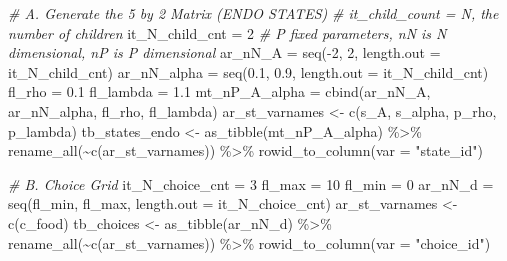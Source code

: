 \documentclass[
]{book}
\newenvironment{Shaded}{\begin{snugshade}}{\end{snugshade}}
\newcommand{\AttributeTok}[1]{\textcolor[rgb]{0.77,0.63,0.00}{#1}}
\newcommand{\CommentTok}[1]{\textcolor[rgb]{0.56,0.35,0.01}{\textit{#1}}}
\newcommand{\DecValTok}[1]{\textcolor[rgb]{0.00,0.00,0.81}{#1}}
\newcommand{\FloatTok}[1]{\textcolor[rgb]{0.00,0.00,0.81}{#1}}
\newcommand{\FunctionTok}[1]{\textcolor[rgb]{0.00,0.00,0.00}{#1}}
\newcommand{\NormalTok}[1]{#1}
\newcommand{\OtherTok}[1]{\textcolor[rgb]{0.56,0.35,0.01}{#1}}
\newcommand{\SpecialCharTok}[1]{\textcolor[rgb]{0.00,0.00,0.00}{#1}}
\newcommand{\StringTok}[1]{\textcolor[rgb]{0.31,0.60,0.02}{#1}}
\begin{document}
\begin{Shaded}
\begin{Highlighting}[]
\CommentTok{\# A. Generate the 5 by 2 Matrix (ENDO STATES)}
\CommentTok{\# it\_child\_count = N, the number of children}
\NormalTok{it\_N\_child\_cnt }\OtherTok{=} \DecValTok{2}
\CommentTok{\# P fixed parameters, nN is N dimensional, nP is P dimensional}
\NormalTok{ar\_nN\_A }\OtherTok{=} \FunctionTok{seq}\NormalTok{(}\SpecialCharTok{{-}}\DecValTok{2}\NormalTok{, }\DecValTok{2}\NormalTok{, }\AttributeTok{length.out =}\NormalTok{ it\_N\_child\_cnt)}
\NormalTok{ar\_nN\_alpha }\OtherTok{=} \FunctionTok{seq}\NormalTok{(}\FloatTok{0.1}\NormalTok{, }\FloatTok{0.9}\NormalTok{, }\AttributeTok{length.out =}\NormalTok{ it\_N\_child\_cnt)}
\NormalTok{fl\_rho }\OtherTok{=} \FloatTok{0.1}
\NormalTok{fl\_lambda }\OtherTok{=} \FloatTok{1.1}
\NormalTok{mt\_nP\_A\_alpha }\OtherTok{=} \FunctionTok{cbind}\NormalTok{(ar\_nN\_A, ar\_nN\_alpha, fl\_rho, fl\_lambda)}
\NormalTok{ar\_st\_varnames }\OtherTok{\textless{}{-}} \FunctionTok{c}\NormalTok{(}\StringTok{\textquotesingle{}s\_A\textquotesingle{}}\NormalTok{, }\StringTok{\textquotesingle{}s\_alpha\textquotesingle{}}\NormalTok{, }\StringTok{\textquotesingle{}p\_rho\textquotesingle{}}\NormalTok{, }\StringTok{\textquotesingle{}p\_lambda\textquotesingle{}}\NormalTok{)}
\NormalTok{tb\_states\_endo }\OtherTok{\textless{}{-}} \FunctionTok{as\_tibble}\NormalTok{(mt\_nP\_A\_alpha) }\SpecialCharTok{\%\textgreater{}\%}
  \FunctionTok{rename\_all}\NormalTok{(}\SpecialCharTok{\textasciitilde{}}\FunctionTok{c}\NormalTok{(ar\_st\_varnames)) }\SpecialCharTok{\%\textgreater{}\%}
  \FunctionTok{rowid\_to\_column}\NormalTok{(}\AttributeTok{var =} \StringTok{"state\_id"}\NormalTok{)}

\CommentTok{\# B. Choice Grid}
\NormalTok{it\_N\_choice\_cnt }\OtherTok{=} \DecValTok{3}
\NormalTok{fl\_max }\OtherTok{=} \DecValTok{10}
\NormalTok{fl\_min }\OtherTok{=} \DecValTok{0}
\NormalTok{ar\_nN\_d }\OtherTok{=} \FunctionTok{seq}\NormalTok{(fl\_min, fl\_max, }\AttributeTok{length.out =}\NormalTok{ it\_N\_choice\_cnt)}
\NormalTok{ar\_st\_varnames }\OtherTok{\textless{}{-}} \FunctionTok{c}\NormalTok{(}\StringTok{\textquotesingle{}c\_food\textquotesingle{}}\NormalTok{)}
\NormalTok{tb\_choices }\OtherTok{\textless{}{-}} \FunctionTok{as\_tibble}\NormalTok{(ar\_nN\_d) }\SpecialCharTok{\%\textgreater{}\%}
  \FunctionTok{rename\_all}\NormalTok{(}\SpecialCharTok{\textasciitilde{}}\FunctionTok{c}\NormalTok{(ar\_st\_varnames)) }\SpecialCharTok{\%\textgreater{}\%}
  \FunctionTok{rowid\_to\_column}\NormalTok{(}\AttributeTok{var =} \StringTok{"choice\_id"}\NormalTok{)}


\end{Highlighting}
\end{Shaded}
\end{document}
